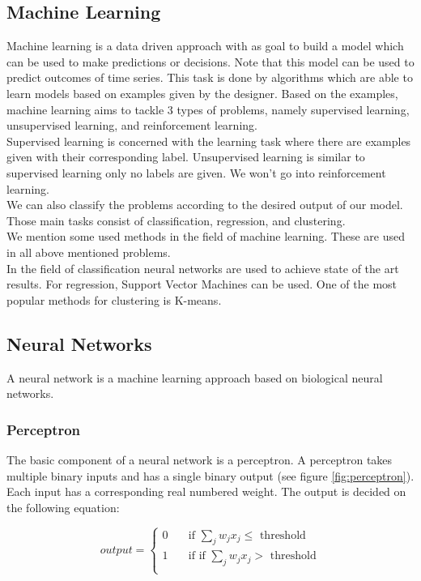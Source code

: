 	\subsection{Machine Learning}
Machine learning is a data driven approach with as goal to build a model which can be	used to make predictions or decisions. Note that this model can be used to predict outcomes of time series. This task is done by algorithms which are able to learn models based on examples given by the designer. Based on the examples, machine learning aims to tackle $3$ types of problems, namely supervised learning, unsupervised learning, and reinforcement learning. \\
Supervised learning is concerned with the learning task where there are examples given with their corresponding label. Unsupervised learning is similar to supervised learning only no labels are given. We won't go into reinforcement learning. \\
We can also classify the problems according to the desired output of our model. Those main tasks consist of classification, regression, and clustering. \\
	
We mention some used methods in the field of machine learning. These are used in all above mentioned problems. \\
In the field of classification neural networks are used to achieve state of the art results. For regression, Support Vector Machines can be used. One of the most popular methods for clustering is K-means. 
	
	
	\subsection{Neural Networks}
	
A neural network is a machine learning approach based on biological neural networks. 


		\subsubsection{Perceptron}

The basic component of a neural network is a perceptron. A perceptron takes multiple binary inputs and has a single binary output (see figure \ref{fig:perceptron}). Each input has a corresponding real numbered weight. The output is decided on the following equation:

\begin{equation} 
output =
  \begin{cases}
    0       	& \quad \text{if } \sum_j w_jx_j \leq \text{ threshold}\\
    1  		& \quad \text{if } \text{if } \sum_j w_jx_j > \text{ threshold}\\
  \end{cases}
\end{equation}
	
